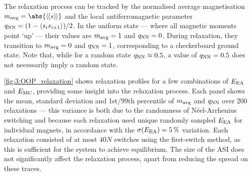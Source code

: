The relaxation process can be tracked by the normalised average magnetisation $\mavg = \abs{\llangle s \rrangle}$ and the local antiferromagnetic parameter $q_\mathrm{NN} = (1 - \langle s_i s_{i+1} \rangle)/2$.
In the uniform state --- where all magnetic moments point `up' --- their values are $m_\mathrm{avg}=1$ and $q_\mathrm{NN}=0$.
During relaxation, they transition to $m_\mathrm{avg}=0$ and $q_\mathrm{NN}=1$, corresponding to a checkerboard ground state.
Note that, while for a random state $q_\mathrm{NN} \approx 0.5$, a value of $q_\mathrm{NN}=0.5$ does not necessarily imply a random state. \par

\cref{fig:3:OOP_relaxation} shows relaxation profiles for a few combinations of $E_\mathrm{EA}$ and $E_\mathrm{MC}$, providing some insight into the relaxation process.
Each panel shows the mean, standard deviation and 1st/99th percentile of $m_\mathrm{avg}$ and $q_\mathrm{NN}$ over 200 relaxations --- this variance is both due to the randomness of N\'eel-Arrhenius switching and because each relaxation used unique randomly sampled $E_\mathrm{EA}$ for individual magnets, in accordance with the $\sigma(E_\mathrm{EA}) = \SI{5}{\percent}$ variation.
Each relaxation consisted of at most $40N$ switches using the first-switch method, as this is sufficient for the system to achieve equilibrium.
The size of the ASI does not significantly affect the relaxation process, apart from reducing the spread on these traces.


